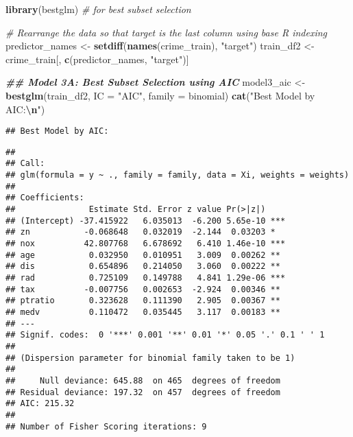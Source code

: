 \documentclass[
]{article}
\newenvironment{Shaded}{\begin{snugshade}}{\end{snugshade}}
\newcommand{\AttributeTok}[1]{\textcolor[rgb]{0.13,0.29,0.53}{#1}}
\newcommand{\CommentTok}[1]{\textcolor[rgb]{0.56,0.35,0.01}{\textit{#1}}}
\newcommand{\DocumentationTok}[1]{\textcolor[rgb]{0.56,0.35,0.01}{\textbf{\textit{#1}}}}
\newcommand{\FunctionTok}[1]{\textcolor[rgb]{0.13,0.29,0.53}{\textbf{#1}}}
\newcommand{\NormalTok}[1]{#1}
\newcommand{\OtherTok}[1]{\textcolor[rgb]{0.56,0.35,0.01}{#1}}
\newcommand{\SpecialCharTok}[1]{\textcolor[rgb]{0.81,0.36,0.00}{\textbf{#1}}}
\newcommand{\StringTok}[1]{\textcolor[rgb]{0.31,0.60,0.02}{#1}}
\begin{document}
\begin{Shaded}
\begin{Highlighting}[]
\FunctionTok{library}\NormalTok{(bestglm)   }\CommentTok{\# for best subset selection}

\CommentTok{\# Rearrange the data so that \textquotesingle{}target\textquotesingle{} is the last column using base R indexing}
\NormalTok{predictor\_names }\OtherTok{\textless{}{-}} \FunctionTok{setdiff}\NormalTok{(}\FunctionTok{names}\NormalTok{(crime\_train), }\StringTok{"target"}\NormalTok{)}
\NormalTok{train\_df2 }\OtherTok{\textless{}{-}}\NormalTok{ crime\_train[, }\FunctionTok{c}\NormalTok{(predictor\_names, }\StringTok{"target"}\NormalTok{)]}

\DocumentationTok{\#\# Model 3A: Best Subset Selection using AIC}
\NormalTok{model3\_aic }\OtherTok{\textless{}{-}} \FunctionTok{bestglm}\NormalTok{(train\_df2, }\AttributeTok{IC =} \StringTok{"AIC"}\NormalTok{, }\AttributeTok{family =}\NormalTok{ binomial)}
\FunctionTok{cat}\NormalTok{(}\StringTok{"Best Model by AIC:}\SpecialCharTok{\textbackslash{}n}\StringTok{"}\NormalTok{)}
\end{Highlighting}
\end{Shaded}

\begin{verbatim}
## Best Model by AIC:
\end{verbatim}

\begin{Shaded}
\end{Shaded}

\begin{verbatim}
## 
## Call:
## glm(formula = y ~ ., family = family, data = Xi, weights = weights)
## 
## Coefficients:
##               Estimate Std. Error z value Pr(>|z|)    
## (Intercept) -37.415922   6.035013  -6.200 5.65e-10 ***
## zn           -0.068648   0.032019  -2.144  0.03203 *  
## nox          42.807768   6.678692   6.410 1.46e-10 ***
## age           0.032950   0.010951   3.009  0.00262 ** 
## dis           0.654896   0.214050   3.060  0.00222 ** 
## rad           0.725109   0.149788   4.841 1.29e-06 ***
## tax          -0.007756   0.002653  -2.924  0.00346 ** 
## ptratio       0.323628   0.111390   2.905  0.00367 ** 
## medv          0.110472   0.035445   3.117  0.00183 ** 
## ---
## Signif. codes:  0 '***' 0.001 '**' 0.01 '*' 0.05 '.' 0.1 ' ' 1
## 
## (Dispersion parameter for binomial family taken to be 1)
## 
##     Null deviance: 645.88  on 465  degrees of freedom
## Residual deviance: 197.32  on 457  degrees of freedom
## AIC: 215.32
## 
## Number of Fisher Scoring iterations: 9
\end{verbatim}
\end{document}
